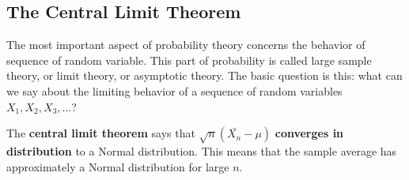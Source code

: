 \documentclass[11pt,a4paper]{report}
\begin{document}
\subsection*{The Central Limit Theorem}

\noindent The most important aspect of probability theory concerns the behavior
of sequence of random variable. This part of probability is called
large sample theory, or limit theory, or asymptotic theory. The basic
question is this: what can we say about the limiting behavior of a
sequence of random variables $X_1,X_2,X_3,...$?

\noindent The \textbf{central limit theorem} says that
$\sqrt{n}(\bar{X_n} - \mu)$ \textbf{converges in distribution} to a
Normal distribution. This means that the sample average has
approximately a Normal distribution for large $n$.
\end{document}
